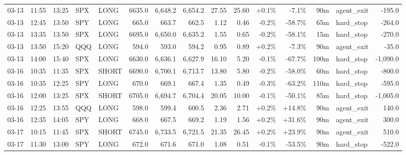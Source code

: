 \documentclass[11pt,a4paper,twoside]{article}
\begin{document}
\begin{landscape}
\begin{center}
\begin{longtable}{>{\color{txtmain}}l l l l l r r r r r r r r >{\color{txtmain}}l r}
03-13 & 11:55 & 13:25 & SPX & LONG & 6635.0 & 6,648.2 & 6,654.2 & 27.55 & 25.60 & \textcolor{wingreen}{+0.1\%} & \textcolor{lossred}{-7.1\%} & 90m & agent\_exit & \textcolor{lossred}{-195.0} \\
03-13 & 12:45 & 13:50 & SPY & LONG & 665.0 & 663.7 & 662.5 & 1.12 & 0.46 & \textcolor{lossred}{-0.2\%} & \textcolor{lossred}{-58.7\%} & 65m & hard\_stop & \textcolor{lossred}{-264.0} \\
03-13 & 13:35 & 13:50 & SPX & LONG & 6695.0 & 6,650.0 & 6,635.2 & 1.55 & 0.65 & \textcolor{lossred}{-0.2\%} & \textcolor{lossred}{-58.1\%} & 15m & hard\_stop & \textcolor{lossred}{-270.0} \\
03-13 & 13:50 & 15:20 & QQQ & LONG & 594.0 & 593.0 & 594.2 & 0.95 & 0.89 & \textcolor{wingreen}{+0.2\%} & \textcolor{lossred}{-7.3\%} & 90m & agent\_exit & \textcolor{lossred}{-35.0} \\
03-13 & 14:00 & 15:40 & SPX & LONG & 6630.0 & 6,636.1 & 6,627.9 & 16.10 & 5.20 & \textcolor{lossred}{-0.1\%} & \textcolor{lossred}{-67.7\%} & 100m & hard\_stop & \textcolor{lossred}{-1,090.0} \\
03-16 & 10:35 & 11:35 & SPX & SHORT & 6690.0 & 6,700.1 & 6,713.7 & 13.80 & 5.80 & \textcolor{lossred}{-0.2\%} & \textcolor{lossred}{-58.0\%} & 60m & hard\_stop & \textcolor{lossred}{-800.0} \\
03-16 & 10:35 & 12:25 & SPY & LONG & 670.0 & 669.1 & 667.4 & 1.35 & 0.49 & \textcolor{lossred}{-0.3\%} & \textcolor{lossred}{-63.2\%} & 110m & hard\_stop & \textcolor{lossred}{-595.0} \\
03-16 & 12:00 & 13:25 & SPX & SHORT & 6705.0 & 6,694.7 & 6,704.4 & 20.05 & 10.00 & \textcolor{lossred}{-0.1\%} & \textcolor{lossred}{-50.1\%} & 85m & hard\_stop & \textcolor{lossred}{-1,005.0} \\
03-16 & 12:25 & 13:55 & QQQ & LONG & 598.0 & 599.4 & 600.5 & 2.36 & 2.71 & \textcolor{wingreen}{+0.2\%} & \textcolor{wingreen}{+14.8\%} & 90m & agent\_exit & \textcolor{wingreen}{140.0} \\
03-16 & 12:35 & 14:05 & SPY & LONG & 668.0 & 667.5 & 669.2 & 1.19 & 1.56 & \textcolor{wingreen}{+0.2\%} & \textcolor{wingreen}{+31.6\%} & 90m & agent\_exit & \textcolor{wingreen}{300.0} \\
03-17 & 10:15 & 11:45 & SPX & SHORT & 6745.0 & 6,733.5 & 6,721.5 & 21.35 & 26.45 & \textcolor{wingreen}{+0.2\%} & \textcolor{wingreen}{+23.9\%} & 90m & agent\_exit & \textcolor{wingreen}{510.0} \\
03-17 & 11:30 & 13:00 & SPY & LONG & 672.0 & 671.6 & 671.0 & 1.08 & 0.51 & \textcolor{lossred}{-0.1\%} & \textcolor{lossred}{-53.5\%} & 90m & hard\_stop & \textcolor{lossred}{-522.0} \\

\end{longtable}
\end{center}
\end{landscape}
\end{document}
